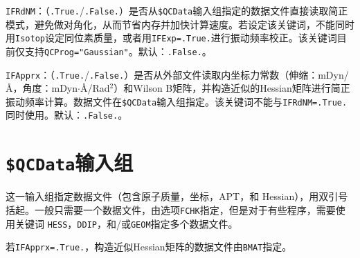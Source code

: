 \documentclass[12pt,a4paper,openany,twoside,cap]{ctexbook}
\begin{document}
\bigskip{}
\verb|IFRdNM|：（\verb|.True.|/\verb|.False.|）是否从\texttt{\$QCData}输入组指定的数据文件直接读取简正模式，避免做对角化，从而节省内存并加快计算速度。若设定该关键词，不能同时用\verb|Isotop|设定同位素质量，或者用\verb|IFExp=.True.|进行振动频率校正。该关键词目前仅支持\verb|QCProg="Gaussian"|。默认：\verb|.False.|。

\bigskip{}
\verb|IFApprx|：（\verb|.True.|/\verb|.False.|）是否从外部文件读取内坐标力常数（伸缩：mDyn/\AA，角度：mDyn$\cdot$\AA/Rad$^2$）和Wilson B矩阵，并构造近似的Hessian矩阵进行简正振动频率计算。数据文件在\texttt{\$QCData}输入组指定。该关键词不能与\verb|IFRdNM=.True.|同时使用。默认：\verb|.False.|。


\section{\texttt{\$QCData}输入组} \label{sec:inp-qcdata}

这一输入组指定数据文件（包含原子质量，坐标，APT，和 Hessian），用双引号括起。一般只需要一个数据文件，由选项\verb|FCHK|指定，但是对于有些程序，需要使用关键词
\verb|HESS|，\verb|DDIP|，和/或\verb|GEOM|指定多个数据文件。

若\verb|IFApprx=.True.|，构造近似Hessian矩阵的数据文件由\verb|BMAT|指定。
\end{document}
